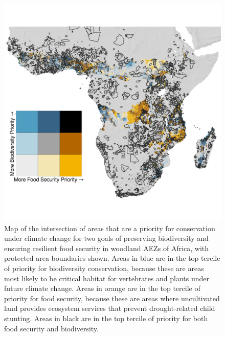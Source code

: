 \documentclass{article}
\begin{document}
\begin{figure}[h!]
	\begin{center}
		\includegraphics[width=\linewidth]{Bivariate_Map_WDPA.png}
		\caption{Map of the intersection of areas that are a priority for conservation under climate change for two goals of preserving biodiversity and ensuring resilient food security in woodland AEZs of Africa, with protected area boundaries shown.  Areas in blue are in the top tercile of priority for biodiversity conservation, because these are areas most likely to be critical habitat for vertebrates and plants under future climate change.  Areas in orange are in the top tercile of priority for food security, because these are areas where uncultivated land provides ecosystem services that prevent drought-related child stunting.  Areas in black are in the top tercile of priority for both food security and biodiversity.}
		\label{fig:Bivariate_Map_WDPA}
	\end{center}
\end{figure}
\end{document}
